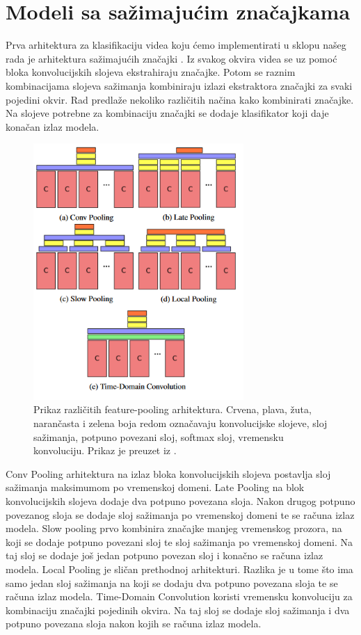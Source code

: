 \documentclass[times, utf8, diplomski,  numeric]{fer}
\begin{document}
\section{Modeli sa sažimajućim značajkama}
Prva arhitektura za klasifikaciju videa koju ćemo implementirati u sklopu našeg rada je arhitektura sažimajućih značajki . Iz svakog okvira videa se uz pomoć bloka konvolucijskih slojeva ekstrahiraju značajke. Potom se raznim kombinacijama slojeva sažimanja kombiniraju izlazi ekstraktora značajki za svaki pojedini okvir. Rad \cite{feature-pooling} predlaže nekoliko različitih načina kako kombinirati značajke. Na slojeve potrebne za kombinaciju značajki se dodaje klasifikator koji daje konačan izlaz modela. 
\begin{figure}[htb]
\centering
\includegraphics[width=8cm]{./images/feature-pooling}
\caption{Prikaz različitih feature-pooling arhitektura. Crvena, plava, žuta, narančasta i zelena boja redom označavaju konvolucijske slojeve, sloj sažimanja, potpuno povezani sloj, softmax sloj, vremensku konvoluciju. Prikaz je preuzet iz \cite{feature-pooling}.}
\label{fig:rfeature-pooling}
\end{figure}
Conv Pooling arhitektura na izlaz bloka konvolucijskih slojeva postavlja sloj sažimanja maksimumom po vremenskoj domeni. Late Pooling na blok konvolucijskih slojeva dodaje dva potpuno povezana sloja. Nakon drugog potpuno povezanog sloja se dodaje sloj sažimanja po vremenskoj domeni te se računa izlaz modela. Slow pooling prvo kombinira značajke manjeg vremenskog prozora, na koji se dodaje potpuno povezani sloj te sloj sažimanja po vremenskoj domeni. Na taj sloj se dodaje još jedan potpuno povezan sloj i konačno se računa izlaz modela. Local Pooling je sličan prethodnoj arhitekturi. Razlika je u tome što ima samo jedan sloj sažimanja na koji se dodaju dva potpuno povezana sloja te se računa izlaz modela. Time-Domain Convolution koristi vremensku konvoluciju za kombinaciju značajki pojedinih okvira. Na taj sloj se dodaje sloj sažimanja i dva potpuno povezana sloja nakon kojih se računa izlaz modela. 
\end{document}
